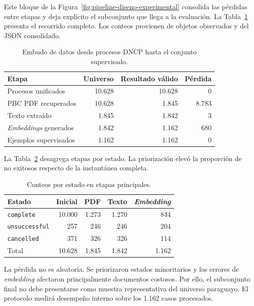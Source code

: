 Este bloque de la Figura~\ref{fig:pipeline-diseno-experimental} consolida las pérdidas entre etapas y deja explícito el subconjunto que llega a la evaluación. La Tabla~\ref{tab:funnel} presenta el recorrido completo. Los conteos provienen de objetos observados y del JSON consolidado.

\begin{table}[H]
\centering
\caption{Embudo de datos desde procesos DNCP hasta el conjunto supervisado.}
\label{tab:funnel}
\begin{tabular}{p{5.3cm}rrr}
\toprule
\textbf{Etapa} & \textbf{Universo} & \textbf{Resultado válido} & \textbf{Pérdida} \\
\midrule
Procesos unificados & 10.628 & 10.628 & 0 \\
PBC PDF recuperados & 10.628 & 1.845 & 8.783 \\
Texto extraído & 1.845 & 1.842 & 3 \\
\textit{Embeddings} generados & 1.842 & 1.162 & 680 \\
Ejemplos supervisados & 1.162 & 1.162 & 0 \\
\bottomrule
\end{tabular}
\end{table}

La Tabla~\ref{tab:funnel_status} desagrega etapas por estado. La priorización elevó la proporción de no exitosos respecto de la instantánea completa.

\begin{table}[H]
\centering
\caption{Conteos por estado en etapas principales.}
\label{tab:funnel_status}
\begin{tabular}{lrrrr}
\toprule
\textbf{Estado} & \textbf{Inicial} & \textbf{PDF} & \textbf{Texto} & \textbf{\textit{Embedding}} \\
\midrule
\texttt{complete} & 10.000 & 1.273 & 1.270 & 844 \\
\texttt{unsuccessful} & 257 & 246 & 246 & 204 \\
\texttt{cancelled} & 371 & 326 & 326 & 114 \\
\midrule
Total & 10.628 & 1.845 & 1.842 & 1.162 \\
\bottomrule
\end{tabular}
\end{table}

La pérdida no es aleatoria. Se priorizaron estados minoritarios y los errores de \textit{embedding} afectaron principalmente documentos costosos. Por ello, el subconjunto final no debe presentarse como muestra representativa del universo paraguayo. El protocolo medirá desempeño interno sobre los 1.162 casos procesados.

